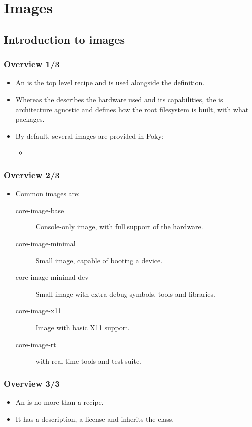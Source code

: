 \section{Images}
\subsection{Introduction to images}

\begin{frame}
  \frametitle{Overview 1/3}
  \begin{itemize}
    \item An  is the top level recipe and is used
      alongside the  definition.
    \item Whereas the  describes the hardware used and
      its capabilities, the  is architecture agnostic and
      defines how the root filesystem is built, with what packages.
    \item By default, several images are provided in Poky:
      \begin{itemize}
        \item {}
      \end{itemize}
  \end{itemize}
\end{frame}

\begin{frame}
  \frametitle{Overview 2/3}
  \begin{itemize}
    \item Common images are:
      \begin{description}
        \item[core-image-base] Console-only image, with full support
          of the hardware.
        \item[core-image-minimal] Small image, capable of booting a
          device.
        \item[core-image-minimal-dev] Small image with extra debug
          symbols, tools and libraries.
        \item[core-image-x11] Image with basic X11 support.
        \item[core-image-rt]  with real time
          tools and test suite.
      \end{description}
  \end{itemize}
\end{frame}

\begin{frame}
  \frametitle{Overview 3/3}
  \begin{itemize}
    \item An  is no more than a recipe.
    \item It has a description, a license and inherits the
       class.
  \end{itemize}
\end{frame}

